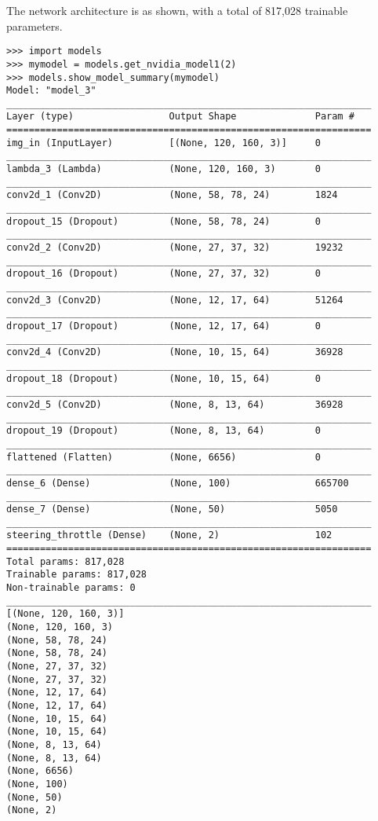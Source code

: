 The network architecture is as shown, with a total of 817,028 trainable parameters.
\begin{verbatim}
>>> import models
>>> mymodel = models.get_nvidia_model1(2)
>>> models.show_model_summary(mymodel)
Model: "model_3"
_________________________________________________________________
Layer (type)                 Output Shape              Param #   
=================================================================
img_in (InputLayer)          [(None, 120, 160, 3)]     0         
_________________________________________________________________
lambda_3 (Lambda)            (None, 120, 160, 3)       0         
_________________________________________________________________
conv2d_1 (Conv2D)            (None, 58, 78, 24)        1824      
_________________________________________________________________
dropout_15 (Dropout)         (None, 58, 78, 24)        0         
_________________________________________________________________
conv2d_2 (Conv2D)            (None, 27, 37, 32)        19232     
_________________________________________________________________
dropout_16 (Dropout)         (None, 27, 37, 32)        0         
_________________________________________________________________
conv2d_3 (Conv2D)            (None, 12, 17, 64)        51264     
_________________________________________________________________
dropout_17 (Dropout)         (None, 12, 17, 64)        0         
_________________________________________________________________
conv2d_4 (Conv2D)            (None, 10, 15, 64)        36928     
_________________________________________________________________
dropout_18 (Dropout)         (None, 10, 15, 64)        0         
_________________________________________________________________
conv2d_5 (Conv2D)            (None, 8, 13, 64)         36928     
_________________________________________________________________
dropout_19 (Dropout)         (None, 8, 13, 64)         0         
_________________________________________________________________
flattened (Flatten)          (None, 6656)              0         
_________________________________________________________________
dense_6 (Dense)              (None, 100)               665700    
_________________________________________________________________
dense_7 (Dense)              (None, 50)                5050      
_________________________________________________________________
steering_throttle (Dense)    (None, 2)                 102       
=================================================================
Total params: 817,028
Trainable params: 817,028
Non-trainable params: 0
_________________________________________________________________
[(None, 120, 160, 3)]
(None, 120, 160, 3)
(None, 58, 78, 24)
(None, 58, 78, 24)
(None, 27, 37, 32)
(None, 27, 37, 32)
(None, 12, 17, 64)
(None, 12, 17, 64)
(None, 10, 15, 64)
(None, 10, 15, 64)
(None, 8, 13, 64)
(None, 8, 13, 64)
(None, 6656)
(None, 100)
(None, 50)
(None, 2)    
\end{verbatim}

